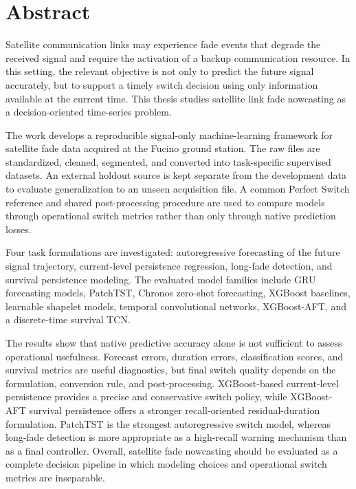 \chapter*{Abstract}

Satellite communication links may experience fade events that degrade the
received signal and require the activation of a backup communication resource.
In this setting, the relevant objective is not only to predict the future
signal accurately, but to support a timely switch decision using only
information available at the current time. This thesis studies satellite link
fade nowcasting as a decision-oriented time-series problem.

The work develops a reproducible signal-only machine-learning framework for
satellite fade data acquired at the Fucino ground station. The raw files are
standardized, cleaned, segmented, and converted into task-specific supervised
datasets. An external holdout source is kept separate from the development
data to evaluate generalization to an unseen acquisition file. A common
Perfect Switch reference and shared post-processing procedure are used to
compare models through operational switch metrics rather than only through
native prediction losses.

Four task formulations are investigated: autoregressive forecasting of the
future signal trajectory, current-level persistence regression, long-fade
detection, and survival persistence modeling. The evaluated model families
include GRU forecasting models, PatchTST, Chronos zero-shot forecasting,
XGBoost baselines, learnable shapelet models, temporal convolutional networks,
XGBoost-AFT, and a discrete-time survival TCN.

The results show that native predictive accuracy alone is not sufficient to
assess operational usefulness. Forecast errors, duration errors,
classification scores, and survival metrics are useful diagnostics, but final
switch quality depends on the formulation, conversion rule, and
post-processing. XGBoost-based current-level persistence provides a precise
and conservative switch policy, while XGBoost-AFT survival persistence offers
a stronger recall-oriented residual-duration formulation. PatchTST is the
strongest autoregressive switch model, whereas long-fade detection is more
appropriate as a high-recall warning mechanism than as a final controller.
Overall, satellite fade nowcasting should be evaluated as a complete decision
pipeline in which modeling choices and operational switch metrics are
inseparable.
